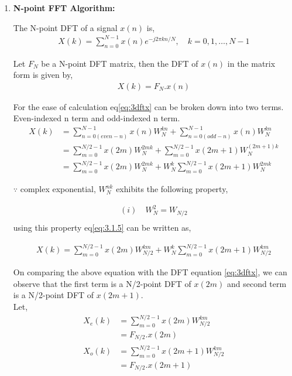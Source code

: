 \documentclass[journal,12pt,twocolumn]{IEEEtran}
\renewcommand\thesection{\arabic{section}}
\begin{document}
\begin{enumerate}[label=\thesection.\arabic*.,ref=\thesection.\theenumi]
\item
{\bf{N-point FFT Algorithm:}}

The N-point DFT of a signal $x(n)$ is,
\begin{align}
    X(k) = \sum_{n=0}^{N-1}x(n)e^{-j2\pi kn/N},
    \quad k=0,1, \ldots, N-1 \label{eq:3dftx}
\end{align}

Let $F_N$ be a N-point DFT matrix, then the DFT of $x(n)$ in the matrix form is given by,
\begin{align}
    X(k) = {F_{N}}.x(n)
\end{align}

For the ease of calculation eq\eqref{eq:3dftx} can be broken down into two terms.
Even-indexed n term and odd-indexed n term.
\begin{align}
    X(k) &= \sum_{n=0(even-n)}^{N-1} x(n)W^{kn}_{N} + \sum_{n=0(odd-n)}^{N-1} x(n)W^{kn}_{N} \\
    &= \sum_{m=0}^{N/2 -1} x(2m)W^{2mk}_{N} + \sum_{m=0}^{N/2 -1} x(2m+1)W^{(2m+1)k}_{N} \\
    &= \sum_{m=0}^{N/2 -1} x(2m)W^{2mk}_{N} + W^{k}_{N} \sum_{m=0}^{N/2 -1} x(2m+1)W^{2mk}_{N} \label{eq:3.1.5}
\end{align}

$\because$ complex exponential, $W_{N}^{nk}$ exhibits the following property,

\begin{align}
   (i) \quad W^{2}_{N} = W_{N/2}
\end{align}
\begin{align}
    [ \because (e^{-j2\pi kn/N})^2 = e^{-j2\pi kn/{(N/2)}}]
\end{align}
 using this property eq\eqref{eq:3.1.5} can be written as,

\begin{align}
    X(k) = \sum_{m=0}^{{N/2}-1} x(2m)W^{km}_{N/2} +W^{k}_{N} \sum_{m=0}^{{N/2}-1} x(2m+1)W^{km}_{N/2} \label{eq:3.1.8}
\end{align}

On comparing the above equation with the DFT equation \eqref{eq:3dftx}, we can observe that the first term is a N/2-point DFT of $x(2m)$ and second term is a N/2-point DFT of $x(2m+1)$. \\
Let,
\begin{align}
    X_{e}(k) &= \sum_{m=0}^{{N/2}-1} x(2m)W^{km}_{N/2} \\
    &={ F_{N/2}}.x(2m) \\
    X_{o}(k) &= \sum_{m=0}^{{N/2}-1} x(2m+1)W^{km}_{N/2} \\
    &= {F_{N/2}}.x(2m+1)
\end{align}


\end{enumerate}
\end{document}
